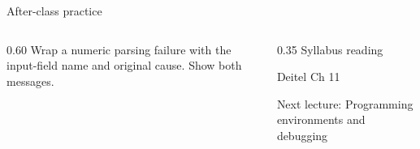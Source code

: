 \documentclass[10pt,aspectratio=169]{beamer}
\begin{document}
\begin{frame}[fragile,t]{After-class practice}
\begin{columns}[T,onlytextwidth]\begin{column}{0.60\textwidth}
Wrap a numeric parsing failure with the input-field name and original cause. Show both messages.
\end{column}\begin{column}{0.35\textwidth}\small
Syllabus reading\par Deitel Ch 11

Next lecture: Programming environments and debugging
\end{column}\end{columns}
\end{frame}
\end{document}
